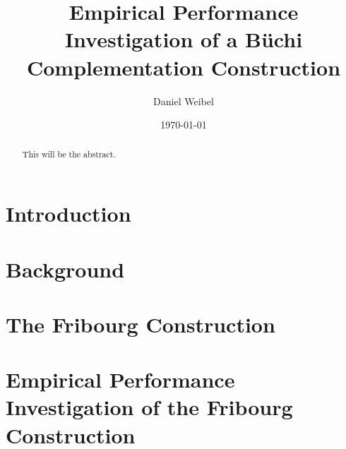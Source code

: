 \documentclass[a4paper,table]{report}
\title{Empirical Performance Investigation of a Büchi\\Complementation Construction}
\author{Daniel Weibel}
\date{\today}
\begin{document}
\maketitle


\begin{abstract}
This will be the abstract.
\end{abstract}

\renewcommand{\abstractname}{Acknowledgements}
\begin{abstract}
\end{abstract}

\dominitoc
\tableofcontents

\chapter{Introduction}
\label{chap_intro}
\minitoc
\newpage


\chapter{Background}
\label{chap_background}
\minitoc
\newpage


\chapter{The Fribourg Construction}
\label{chap_construction}
\minitoc
\newpage


\chapter{Empirical Performance Investigation of the Fribourg Construction}
\label{chap_investigation}
\minitoc
\newpage

\end{document}

